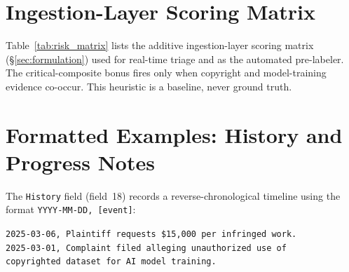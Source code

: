 \section{Ingestion-Layer Scoring Matrix}
\label{app:risk_matrix}

Table~\ref{tab:risk_matrix} lists the additive ingestion-layer scoring matrix (\S\ref{sec:formulation}) used for real-time triage and as the automated pre-labeler. The critical-composite bonus fires only when copyright and model-training evidence co-occur. This heuristic is a baseline, never ground truth.

\begin{table}[h]
\centering
\caption{Ingestion-layer scoring matrix. The critical-composite bonus fires only when copyright and model-training evidence co-occur.}
\label{tab:risk_matrix}
\small
\setlength{\tabcolsep}{3.5pt}
\end{table}

\section{Formatted Examples: History and Progress Notes}
\label{app:examples}

The \texttt{History} field (field~18) records a reverse-chronological timeline using the format \texttt{YYYY-MM-DD, [event]}:
\begin{mycodebox}
\small\texttt{2025-03-06, Plaintiff requests \$15,000 per infringed work.}\\
\texttt{2025-03-01, Complaint filed alleging unauthorized use of}\\
\texttt{\phantom{xxxx}copyrighted dataset for AI model training.}
\end{mycodebox}

